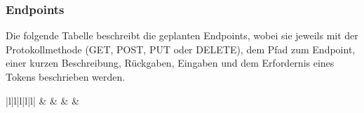 \subsubsection{Endpoints}
\label{chapter:endpoints}

Die folgende Tabelle beschreibt die geplanten Endpoints, wobei  sie jeweils mit der Protokollmethode (GET, POST, PUT oder DELETE), dem Pfad zum Endpoint, einer kurzen Beschreibung, Rückgaben, Eingaben und dem Erfordernis eines Tokens beschrieben werden.

\begin{table}
	\centering
	\begin{tabular}{|l|l|l|l|l|}
		\hline
		 &                                                   &                                                                   &  &                                                                           \\ \hline
		

\end{tabular}
\end{table}
